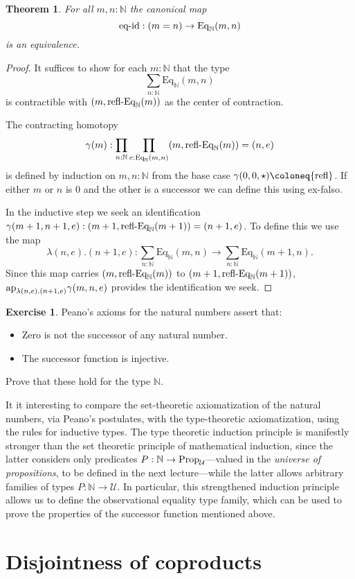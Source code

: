 \documentclass{amsart}
\theoremstyle{theorem}
\newtheorem*{thm}{Theorem}
\theoremstyle{definition}
\newtheorem*{exc}{Exercise}
\theoremstyle{remark}
\newcommand{\0}{\mathbbe{0}}
\newcommand{\1}{\mathbbe{1}}
\newcommand{\2}{\mathbbe{2}}
\newcommand{\3}{\mathbbe{3}}
\newcommand{\4}{\mathbbe{4}}
\newcommand{\term}[1]{{\textup{#1}}}
\newcommand{\type}[1]{{\textup{#1}}}
\newcommand{\bN}{{\mathbb{N}}}
\newcommand{\refl}{\term{refl}}
\newcommand{\ap}{\term{ap}}
\newcommand{\UU}{{\mathcal{U}}}
\newcommand{\Eq}{\mathrm{Eq}}
\newcommand{\Prop}{\type{Prop}_{\UU}}
\begin{document}
\begin{thm} For all $m,n : \bN$ the canonical map
\[ \term{eq-id} : (m=n) \to \Eq_\bN(m,n)\] is an equivalence.
\end{thm}
\begin{proof}
It suffices to show for each $m : \bN$ that the type \[ \sum_{n : \bN} \Eq_\bN(m,n)\] is contractible with $(m,\term{refl-Eq}_\bN(m))$ as the center of contraction.

The contracting homotopy
\[ \gamma(m) : \prod_{n :\bN} \prod_{e :\Eq_\bN(m,n)} (m,\term{refl-Eq}_\bN(m)) = (n,e)\]
is defined by induction on $m,n : \bN$ from the base case $\gamma(0,0, \star) \coloneq \refl$. If either $m$ or $n$ is 0 and the other is a successor we can define this using ex-falso.

In the inductive step we seek an identification $\gamma(m+1,n+1,e) : (m+1, \term{refl-Eq}_\bN(m+1)) = (n+1,e)$. To define this we use the map
\[ \lambda(n,e).(n+1,e) : \sum_{n:\bN}\Eq_\bN(m,n) \to \sum_{n : \bN}\Eq_\bN(m+1,n).\]
Since this map carries $(m,\term{refl-Eq}_\bN(m))$ to $(m+1,\term{refl-Eq}_\bN(m+1))$, $\ap_{ \lambda(n,e).(n+1,e)}\gamma(m,n,e)$ provides the identification we seek.
\end{proof}

\begin{exc} Peano's axioms for the natural numbers assert that:
\begin{itemize}
\item Zero is not the successor of any natural number.
\item The successor function is injective.
\end{itemize}
Prove that these hold for the type $\bN$.
\end{exc}

It it interesting to compare the set-theoretic axiomatization of the natural numbers, via Peano's postulates, with the type-theoretic axiomatization, using the rules for inductive types. The type theoretic induction principle is manifestly stronger than the set theoretic principle of mathematical induction, since the latter considers only predicates $P : \bN \to \Prop$---valued in the \emph{universe of propositions}, to be defined in the next lecture---while the latter allows arbitrary families of types $P \colon \bN \to \UU$. In particular, this strengthened induction principle allows us to define the observational equality type family, which can be used to prove the properties of the successor function mentioned above.

\section*{Disjointness of coproducts}
\end{document}
